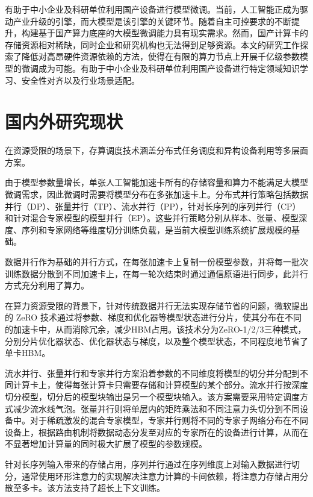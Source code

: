 \documentclass[bachelor,openany,oneside,color,AutoFakeBold=true]{buaathesis}
\begin{document}
有助于中小企业及科研单位利用国产设备进行模型微调。当前，人工智能正成为驱动产业升级的引擎，而大模型是该引擎的关键环节。随着自主可控要求的不断提升，构建基于国产算力底座的大模型微调能力具有现实需求。然而，国产计算卡的存储资源相对稀缺，同时企业和研究机构也无法得到足够资源。本文的研究工作探索了降低对高昂硬件资源依赖的方法，使得在有限的算力节点上开展千亿级参数模型的微调成为可能。有助于中小企业及科研单位利用国产设备进行特定领域知识学习、安全性对齐以及行业场景适配。


\section{国内外研究现状}
在资源受限的场景下，存算调度技术涵盖分布式任务调度和异构设备利用等多层面方案。

由于模型参数量增长，单张人工智能加速卡所有的存储容量和算力不能满足大模型微调需求，因此微调时需要将模型分布在多张加速卡上。分布式并行策略包括数据并行（DP）、张量并行（TP）、流水并行（PP），针对长序列的序列并行（CP）和针对混合专家模型的模型并行（EP）。这些并行策略分别从样本、张量、模型深度、序列和专家网络等维度切分训练负载，是当前大模型训练系统扩展规模的基础。

数据并行作为基础的并行方式，在每张加速卡上复制一份模型参数，并将每一批次训练数据分散到不同加速卡上，在每一轮次结束时通过通信原语进行同步，此并行方式充分利用了算力。

在算力资源受限的背景下，针对传统数据并行无法实现存储节省的问题，微软提出的 ZeRO 技术通过将参数、梯度和优化器等模型状态进行分片，使其分布在不同的加速卡中，从而消除冗余，减少HBM占用。该技术分为ZeRO-1/2/3三种模式，分别分片优化器状态、优化器状态与梯度，以及整个模型状态，不同程度地节省了单卡HBM。

流水并行、张量并行和专家并行方案沿着参数的不同维度将模型的切分并分配到不同计算卡上，使得每张计算卡只需要存储和计算模型的某个部分。流水并行按深度切分模型，切分后的模型块输出是另一个模型块输入。该方案需要采用特定调度方式减少流水线气泡。张量并行则将单层内的矩阵乘法和不同注意力头切分到不同设备中。对于稀疏激发的混合专家模型，专家并行则将不同的专家子网络分布在不同设备上，根据路由机制将数据动态分发至对应的专家所在的设备进行计算，从而在不显著增加计算量的同时极大扩展了模型的参数规模。

针对长序列输入带来的存储占用，序列并行通过在序列维度上对输入数据进行切分，通常使用环形注意力的实现解决注意力计算的卡间依赖，将注意力存储占用分散至多卡。该方法支持了超长上下文训练。
\end{document}
